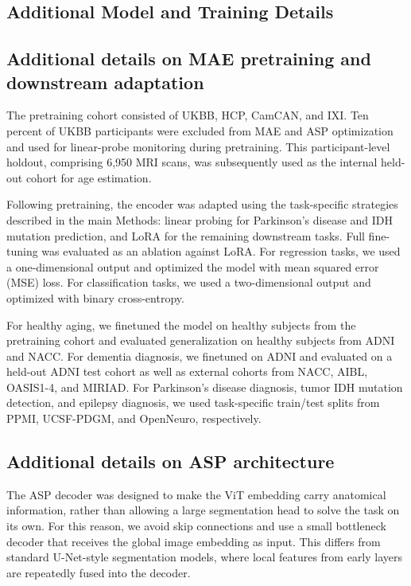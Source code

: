 \documentclass[pdflatex,sn-nature]{sn-jnl}%
\theoremstyle{thmstyleone}%
\theoremstyle{thmstyletwo}%
\theoremstyle{thmstylethree}%
\begin{document}
\begin{appendices}
\section{Additional Model and Training Details}
\label{sec:additional_model_training_details}

\subsection{Additional details on MAE pretraining and downstream adaptation}
\label{sec:mae_additional}
The pretraining cohort consisted of UKBB, HCP, CamCAN, and IXI. Ten percent of UKBB participants were excluded from MAE and ASP optimization and used for linear-probe monitoring during pretraining. This participant-level holdout, comprising 6,950 MRI scans, was subsequently used as the internal held-out cohort for age estimation.

Following pretraining, the encoder was adapted using the task-specific strategies described in the main Methods: linear probing for Parkinson's disease and IDH mutation prediction, and LoRA for the remaining downstream tasks. Full fine-tuning was evaluated as an ablation against LoRA. For regression tasks, we used a one-dimensional output and optimized the model with mean squared error (MSE) loss. For classification tasks, we used a two-dimensional output and optimized with binary cross-entropy.

For healthy aging, we finetuned the model on healthy subjects from the pretraining cohort and evaluated generalization on healthy subjects from ADNI and NACC. For dementia diagnosis, we finetuned on ADNI and evaluated on a held-out ADNI test cohort as well as external cohorts from NACC, AIBL, OASIS1-4, and MIRIAD. For Parkinson’s disease diagnosis, tumor IDH mutation detection, and epilepsy diagnosis, we used task-specific train/test splits from PPMI, UCSF-PDGM, and OpenNeuro, respectively.


\subsection{Additional details on ASP architecture}
\label{sec:seg_architecture}


The ASP decoder was designed to make the ViT embedding carry anatomical information, rather than allowing a large segmentation head to solve the task on its own. For this reason, we avoid skip connections and use a small bottleneck decoder that receives the global image embedding as input. This differs from standard U-Net-style segmentation models, where local features from early layers are repeatedly fused into the decoder.


\end{appendices}
\end{document}
